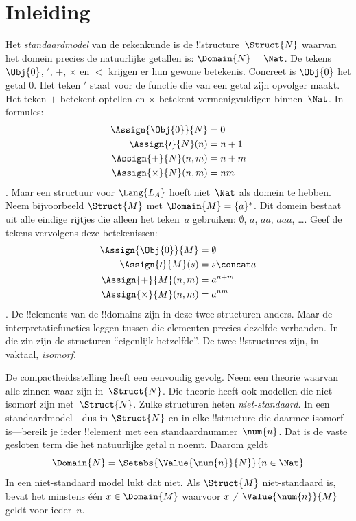 \documentclass[../../../include/open-logic-section]{subfiles}
\begin{document}
\section{Inleiding}

Het \emph{standaardmodel} van de rekenkunde is de
!!{structure}~$\Struct{N}$ waarvan het domein precies de natuurlijke
getallen is: $\Domain{N} = \Nat$. De tekens $\Obj{0}$, $\prime$, $+$,
$\times$ en $<$ krijgen er hun gewone betekenis. Concreet is $\Obj{0}$ het
getal $0$. Het teken $\prime$ staat voor de functie die van een getal zijn
opvolger maakt. Het teken $+$ betekent optellen en $\times$ betekent
vermenigvuldigen binnen~$\Nat$. In formules:
\begin{align*}
  \Assign{\Obj{0}}{N} & = 0\\
  \Assign{\prime}{N}(n) & = n + 1\\
  \Assign{+}{N}(n, m) & = n + m\\
  \Assign{\times}{N}(n, m) & = nm
\end{align*}.
Maar een structuur voor $\Lang{L_A}$ hoeft niet~$\Nat$ als domein te hebben.
Neem bijvoorbeeld $\Struct{M}$ met
$\Domain{M} = \{a\}^*$. Dit domein bestaat uit alle eindige rijtjes die
alleen het teken~$a$ gebruiken: $\emptyset$, $a$, $aa$, $aaa$, \dots. Geef
de tekens vervolgens deze betekenissen:
\begin{align*}
  \Assign{\Obj{0}}{M} & = \emptyset\\
  \Assign{\prime}{M}(s) & = s \concat a\\
  \Assign{+}{M}(n, m) & = a^{n + m}\\
  \Assign{\times}{M}(n, m) & = a^{nm}
\end{align*}.
De !!{element}s van de !!{domain}s zijn in deze twee structuren anders.
Maar de interpretatiefuncties leggen tussen die elementen precies dezelfde
verbanden. In die zin zijn de structuren ``eigenlijk hetzelfde''. De twee
!!{structure}s zijn, in vaktaal, \emph{isomorf}.

De compactheidsstelling heeft een eenvoudig gevolg. Neem een theorie waarvan
alle zinnen waar zijn in~$\Struct{N}$. Die theorie heeft ook modellen die
niet isomorf zijn met~$\Struct{N}$. Zulke structuren heten
\emph{niet-standaard}. In een standaardmodel---dus in $\Struct{N}$ en in
elke !!{structure} die daarmee isomorf is---bereik je ieder !!{element} met
een standaardnummer~$\num{n}$. Dat is de vaste gesloten term die het
natuurlijke getal n noemt. Daarom geldt
\[
\Domain{N} = \Setabs{\Value{\num{n}}{N}}{n \in \Nat}
\]
In een niet-standaard model lukt dat niet. Als $\Struct{M}$ niet-standaard
is, bevat het minstens één $x \in \Domain{M}$ waarvoor
$x \neq \Value{\num{n}}{M}$ geldt voor ieder~$n$.
\end{document}
